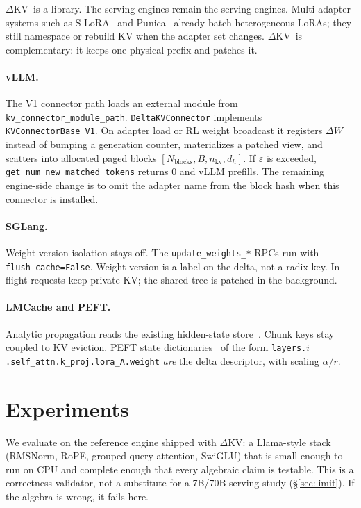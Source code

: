 \documentclass{article}
\newcommand{\dkv}{$\Delta$KV}
\begin{document}
\dkv\ is a library.
The serving engines remain the serving engines.
Multi-adapter systems such as S-LoRA~\citep{sheng2024slora} and
Punica~\citep{chen2024punica} already batch heterogeneous LoRAs; they
still namespace or rebuild KV when the adapter set changes.
\dkv\ is complementary: it keeps one physical prefix and patches it.

\paragraph{vLLM.}
The V1 connector path loads an external module from
\texttt{kv\_connector\_module\_path}.
\texttt{DeltaKVConnector} implements \texttt{KVConnectorBase\_V1}.
On adapter load or RL weight broadcast it registers $\Delta W$ instead of
bumping a generation counter, materializes a patched view, and scatters
into allocated paged blocks
$[N_{\mathrm{blocks}}, B, n_{\mathrm{kv}}, d_h]$.
If $\varepsilon$ is exceeded, \texttt{get\_num\_new\_matched\_tokens}
returns $0$ and vLLM prefills.
The remaining engine-side change is to omit the adapter name from the
block hash when this connector is installed.

\paragraph{SGLang.}
Weight-version isolation stays off.
The \texttt{update\_weights\_*} RPCs run with
\texttt{flush\_cache=False}.
Weight version is a label on the delta, not a radix key.
In-flight requests keep private KV; the shared tree is patched in the
background.

\paragraph{LMCache and PEFT.}
Analytic propagation reads the existing hidden-state
store~\citep{lmcache}.
Chunk keys stay coupled to KV eviction.
PEFT state dictionaries~\citep{mangrulkar2022peft} of the form
\texttt{layers.$i$.self\_attn.k\_proj.lora\_A.weight} \emph{are} the
delta descriptor, with scaling $\alpha/r$.

\section{Experiments}
\label{sec:exp}

We evaluate on the reference engine shipped with \dkv: a Llama-style
stack (RMSNorm, RoPE, grouped-query attention, SwiGLU) that is small
enough to run on CPU and complete enough that every algebraic claim is
testable.
This is a correctness validator, not a substitute for a 7B/70B serving
study (\S\ref{sec:limit}).
If the algebra is wrong, it fails here.
\end{document}
